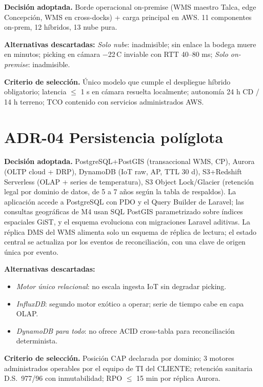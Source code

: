 \textbf{Decisión adoptada.} Borde operacional on-premise (WMS maestro Talca, edge Concepción, WMS en cross-docks) + carga principal en AWS. 11 componentes on-prem, 12 híbridos, 13 nube pura.

\textbf{Alternativas descartadas:} \emph{Solo nube}: inadmisible; sin enlace la bodega muere en minutos; picking en cámara $-$22\,\textdegree{}C inviable con RTT 40--80 ms; \emph{Solo on-premise}: inadmisible.

\textbf{Criterio de selección.} Único modelo que cumple el despliegue híbrido obligatorio; latencia $\leq$ 1 s en cámara resuelta localmente; autonomía 24 h CD / 14 h terreno; TCO contenido con servicios administrados AWS.

\section{ADR-04 \textperiodcentered{} Persistencia políglota}
\label{sub:adr-04}

\textbf{Decisión adoptada.} PostgreSQL+PostGIS (transaccional WMS, CP), Aurora (OLTP cloud + DRP), DynamoDB (IoT raw, AP, TTL 30 d), S3+Redshift Serverless (OLAP + series de temperatura), S3 Object Lock/Glacier (retención legal por dominio de datos, de 5 a 7 años según la tabla de respaldos). La aplicación accede a PostgreSQL con PDO y el Query Builder de Laravel; las consultas geográficas de M4 usan SQL PostGIS parametrizado sobre índices espaciales GiST, y el esquema evoluciona con migraciones Laravel aditivas. La réplica DMS del WMS alimenta solo un esquema de réplica de lectura; el estado central se actualiza por los eventos de reconciliación, con una clave de origen única por evento.

\textbf{Alternativas descartadas:}

\begin{itemize}
  \item \emph{Motor único relacional}: no escala ingesta IoT sin degradar picking.
  \item \emph{InfluxDB}: segundo motor exótico a operar; serie de tiempo cabe en capa OLAP.
  \item \emph{DynamoDB para todo}: no ofrece ACID cross-tabla para reconciliación determinista.
\end{itemize}

\textbf{Criterio de selección.} Posición CAP declarada por dominio; 3 motores administrados operables por el equipo de TI del CLIENTE; retención sanitaria D.S.~977/96 con inmutabilidad; RPO $\leq$ 15 min por réplica Aurora.

